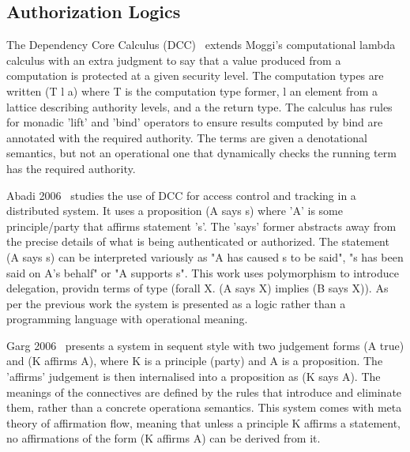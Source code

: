 \subsection{Authorization Logics}

The Dependency Core Calculus (DCC)~\cite{Abadi1999:DCC} extends Moggi's computational lambda calculus with an extra judgment to say that a value produced from a computation is protected at a given security level. The computation types are written (T l a) where T is the computation type former, l an element from a lattice describing authority levels, and a the return type. The calculus has rules for monadic 'lift' and 'bind' operators to ensure results computed by bind are annotated with the required authority. The terms are given a denotational semantics, but not an operational one that dynamically checks the running term has the required authority.

Abadi 2006~\cite{Abadi2007:AccessControl} studies the use of DCC for access control and tracking in a distributed system. It uses a proposition (A says s) where 'A' is some principle/party that affirms statement 's'. The 'says' former abstracts away from the precise details of what is being authenticated or authorized. The statement (A says s) can be interpreted variously as "A has caused s to be said", "s has been said on A's behalf" or "A supports s". This work uses polymorphism to introduce delegation, providn terms of type (forall X. (A says X) implies (B says X)). As per the previous work \cite{Abadi1999:DCC} the system is presented as a logic rather than a programming language with operational meaning.

Garg 2006~\cite{Garg2006:Constructive} presents a system in sequent style with two judgement forms (A true) and (K affirms A), where K is a principle (party) and A is a proposition. The 'affirms' judgement is then internalised into a proposition as (K says A). The meanings of the connectives are defined by the rules that introduce and eliminate them, rather than a concrete operationa semantics. This system comes with meta theory of affirmation flow, meaning that unless a principle K affirms a statement, no affirmations of the form (K affirms A) can be derived from it.

